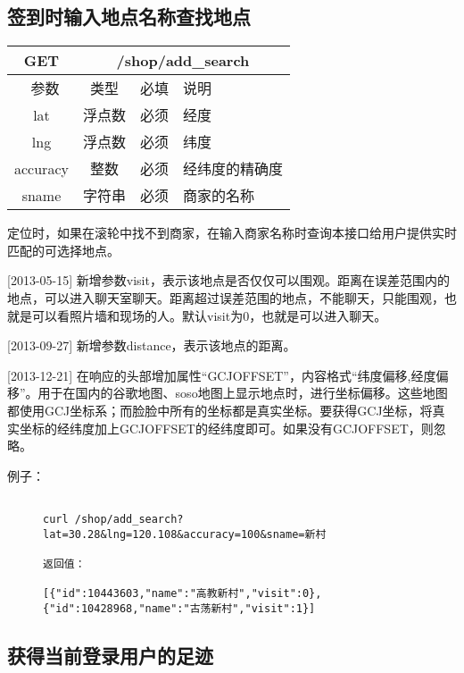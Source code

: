 \documentclass[cs4size]{ctexartutf8}
\begin{document}
\subsection{签到时输入地点名称查找地点}

\begin{table}[H]
   \begin{center}
\begin{tabular}{|c|c|c|p{12cm}|}
\hline
GET & \multicolumn{3}{|c|}{/shop/add\_search} \\
\hline\hline
 \  参数  & 类型 & 必填 &  说明  \\
\hline
 lat  & 浮点数 & 必须 & 经度\\
\hline
 lng  &  浮点数 & 必须 & 纬度\\ 
\hline
 accuracy  & 整数 & 必须 & 经纬度的精确度\\ 
\hline
 sname  & 字符串 & 必须 &  商家的名称\\  
\hline
\end{tabular}
   \end{center}
\end{table}

定位时，如果在滚轮中找不到商家，在输入商家名称时查询本接口给用户提供实时匹配的可选择地点。

[2013-05-15] 新增参数visit，表示该地点是否仅仅可以围观。距离在误差范围内的地点，可以进入聊天室聊天。距离超过误差范围的地点，不能聊天，只能围观，也就是可以看照片墙和现场的人。默认visit为0，也就是可以进入聊天。

[2013-09-27] 新增参数distance，表示该地点的距离。

[2013-12-21] 在响应的头部增加属性“GCJOFFSET”，内容格式“纬度偏移,经度偏移”。用于在国内的谷歌地图、soso地图上显示地点时，进行坐标偏移。这些地图都使用GCJ坐标系；而脸脸中所有的坐标都是真实坐标。要获得GCJ坐标，将真实坐标的经纬度加上GCJOFFSET的经纬度即可。如果没有GCJOFFSET，则忽略。

例子：

\begin{figure}[H]
\begin{verbatim}

curl /shop/add_search?lat=30.28&lng=120.108&accuracy=100&sname=新村

返回值：

[{"id":10443603,"name":"高教新村","visit":0},{"id":10428968,"name":"古荡新村","visit":1}]

\end{verbatim}
\end{figure}


\subsection{获得当前登录用户的足迹}
\end{document}
